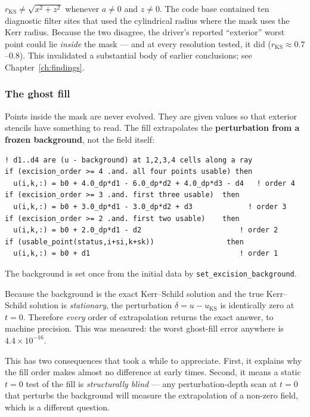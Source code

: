 \gotcha
$r_{\mathrm{KS}} \neq \sqrt{x^2+z^2}$ whenever $a\neq 0$ and $z \neq 0$. The
code base contained ten diagnostic filter sites that used the cylindrical
radius where the mask uses the Kerr radius. Because the two disagree, the
driver's reported ``exterior'' worst point could lie \emph{inside} the mask ---
and at every resolution tested, it did ($r_{\mathrm{KS}} \approx 0.7$--$0.8$).
This invalidated a substantial body of earlier conclusions; see
Chapter~\ref{ch:findings}.

\subsubsection{The ghost fill}

Points inside the mask are never evolved. They are given values so that
exterior stencils have something to read. The fill extrapolates the
\textbf{perturbation from a frozen background}, not the field itself:

\begin{lstlisting}
! d1..d4 are (u - background) at 1,2,3,4 cells along a ray
if (excision_order >= 4 .and. all four points usable) then
  u(i,k,:) = b0 + 4.0_dp*d1 - 6.0_dp*d2 + 4.0_dp*d3 - d4   ! order 4
if (excision_order >= 3 .and. first three usable)  then
  u(i,k,:) = b0 + 3.0_dp*d1 - 3.0_dp*d2 + d3             ! order 3
if (excision_order >= 2 .and. first two usable)    then
  u(i,k,:) = b0 + 2.0_dp*d1 - d2                       ! order 2
if (usable_point(status,i+si,k+sk))                 then
  u(i,k,:) = b0 + d1                                   ! order 1
\end{lstlisting}

The background is set once from the initial data by
\texttt{set\_excision\_background}.

\gotcha
Because the background is the exact Kerr--Schild solution and the true
Kerr--Schild solution is \emph{stationary}, the perturbation $\delta = u -
u_{\mathrm{KS}}$ is identically zero at $t=0$. Therefore \emph{every} order of
extrapolation returns the exact answer, to machine precision. This was
measured: the worst ghost-fill error anywhere is $4.4\times10^{-16}$.

This has two consequences that took a while to appreciate. First, it explains
why the fill order makes almost no difference at early times. Second, it
means a static $t=0$ test of the fill is \emph{structurally blind} --- any
perturbation-depth scan at $t=0$ that perturbs the background will measure the
extrapolation of a non-zero field, which is a different question.

